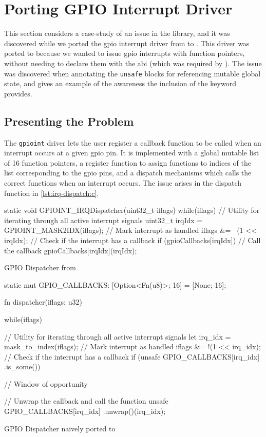 
\section{Porting GPIO Interrupt Driver}
\label{sec:porting-gpioint}

This section considers a case-study of an issue in the {\emdrv} library, and it was discovered while we ported the \gls{gpio} interrupt driver from {\C} to {\rust}.
This driver was ported to {\rust} because we wanted to issue \gls{gpio} interrupts with {\rust} function pointers, without needing to declare them with the {\C} \gls{abi} (which was required by {\emdrv}).
The issue was discovered when annotating the \texttt{unsafe} blocks for referencing mutable global state, and gives an example of the awareness the inclusion of the {\unsafe} keyword provides.

\subsection{Presenting the Problem}

The \texttt{gpioint} driver lets the user register a callback function to be called when an interrupt occurs at a given \gls{gpio} pin.
It is implemented with a global mutable list of 16 function pointers, a register function to assign functions to indices of the list corresponding to the \gls{gpio} pins, and a dispatch mechanisms which calls the correct functions when an interrupt occurs.
The issue arises in the dispatch function in \autoref{lst:irq-dispatch:c}.

\begin{listing}
  \begin{ccode}
static void GPIOINT_IRQDispatcher(uint32_t iflags) {
  while(iflags) {
    // Utility for iterating through all active interrupt signals
    uint32_t irqIdx = GPIOINT_MASK2IDX(iflags);
    // Mark interrupt as handled
    iflags &= ~(1 << irqIdx);
    // Check if the interrupt has a callback
    if (gpioCallbacks[irqIdx]) {
      // Call the callback
      gpioCallbacks[irqIdx](irqIdx);
    }
  }
}
  \end{ccode}
  \caption{GPIO Dispatcher from {\emlib}}
  \label{lst:irq-dispatch:c}
\end{listing}

\begin{listing}
  \begin{rustcode}
static mut GPIO_CALLBACKS: [Option<Fn(u8)>; 16] = [None; 16];

fn dispatcher(iflags: u32) {
  while(iflags) {
    // Utility for iterating through all active interrupt signals
    let irq_idx = mask_to_index(iflags);
    // Mark interrupt as handled
    iflags &= !(1 << irq_idx);
    // Check if the interrupt has a callback
    if (unsafe { GPIO_CALLBACKS[irq_idx] }.is_some()) {
      // Window of opportunity

      // Unwrap the callback and call the function
      unsafe { GPIO_CALLBACKS[irq_idx] }.unwrap()(irq_idx);
    }
  }
}
  \end{rustcode}
  \caption{GPIO Dispatcher naively ported to {\rust}}
  \label{lst:irq-dispatch:rust}
\end{listing}

